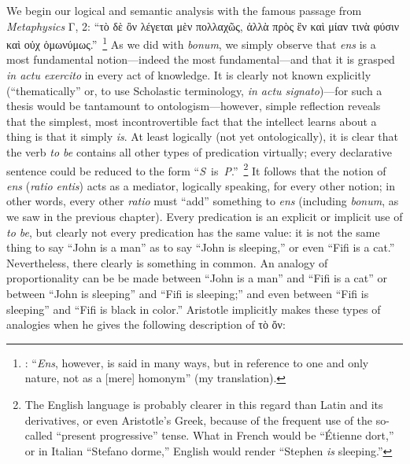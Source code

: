 We begin our logical and semantic analysis with the famous passage from \emph{Metaphysics} Γ, 2: “τὸ δὲ ὂν λέγεται μὲν πολλαχῶς, ἀλλὰ πρὸς ἓν καὶ μίαν τινὰ φύσιν καὶ οὐχ ὁμωνύμως.”\,%
%
\footnote{\Cite[Γ, 2, 1003a33-24]{aristotle:metaphysics}:  “\emph{Ens}, however, is said in many ways, but in reference to one and only nature, not as a [mere] homonym” (my translation).} As we did with \emph{bonum}, we simply observe that \emph{ens}  is a most fundamental notion—indeed the most fundamental—and that it is grasped \emph{in actu exercito} in every act of knowledge. It is clearly not known explicitly (“thematically” or, to use Scholastic terminology, \emph{in actu signato})—for such a thesis would be tantamount to ontologism—however, simple reflection reveals that the simplest, most incontrovertible fact that the intellect learns about a thing is that it simply \emph{is}. At least logically (not yet ontologically), it is clear that the verb \emph{to be} contains all other types of predication virtually; every declarative sentence could be reduced to the form “\emph{S}~is~\emph{P}.”\,%
%
\footnote{The English language is probably clearer in this regard than Latin and its derivatives, or even Aristotle’s Greek, because of the frequent use of the so-called “present progressive” tense. What in French would be “Étienne dort,” or in Italian “Stefano dorme,” English would render “Stephen \emph{is} sleeping.”} It follows that the notion of \emph{ens} (\emph{ratio entis}) acts as a mediator, logically speaking, for every other notion; in other words, every other \emph{ratio} must “add” something to \emph{ens} (including \emph{bonum}, as we saw in the previous chapter). Every predication is an explicit or implicit use of \emph{to be}, but clearly not every predication has the same value: it is not the same thing to say “John is a man” as to say “John is sleeping,” or even “Fifi is a cat.” Nevertheless, there clearly is something in common. An analogy of proportionality can be be made between “John is a man” and “Fifi is a cat” or between “John is sleeping” and “Fifi is sleeping;” and even between “Fifi is sleeping” and “Fifi is black in color.” Aristotle implicitly makes these types of analogies when he gives the following description of τὸ ὄν:

